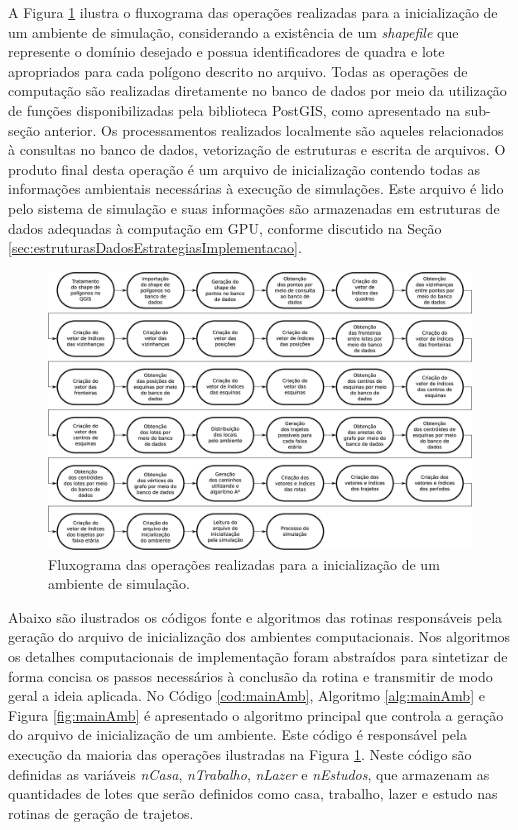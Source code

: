 A Figura \ref{fig:inicializacaoAmbiente} ilustra o fluxograma das operações realizadas para a inicialização de um ambiente de simulação, considerando a existência de um \textit{shapefile} que represente o domínio desejado e possua identificadores de quadra e lote apropriados para cada polígono descrito no arquivo. Todas as operações de computação são realizadas diretamente no banco de dados por meio da utilização de funções disponibilizadas pela biblioteca PostGIS, como apresentado na sub-seção anterior. Os processamentos realizados localmente são aqueles relacionados à consultas no banco de dados, vetorização de estruturas e escrita de arquivos. O produto final desta operação é um arquivo de inicialização contendo todas as informações ambientais necessárias à execução de simulações. Este arquivo é lido pelo sistema de simulação e suas informações são armazenadas em estruturas de dados adequadas à computação em GPU, conforme discutido na Seção \ref{sec:estruturasDadosEstrategiasImplementacao}.

\begin{figure}[H]
  \centering
  \includegraphics[width=1\textwidth]{Figuras/Simula/inicializacaoAmbiente.eps}
  \caption{Fluxograma das operações realizadas para a inicialização de um ambiente de simulação.}
  \label{fig:inicializacaoAmbiente}
\end{figure} 

\newpage

Abaixo são ilustrados os códigos fonte e algoritmos das rotinas responsáveis pela geração do arquivo de inicialização dos ambientes computacionais. Nos algoritmos os detalhes computacionais de implementação foram abstraídos para sintetizar de forma concisa os passos necessários à conclusão da rotina e transmitir de modo geral a ideia aplicada. No Código \ref{cod:mainAmb}, Algoritmo \ref{alg:mainAmb} e Figura \ref{fig:mainAmb} é apresentado o algoritmo principal que controla a geração do arquivo de inicialização de um ambiente. Este código é responsável pela execução da maioria das operações ilustradas na Figura \ref{fig:inicializacaoAmbiente}. Neste código são definidas as variáveis \textit{nCasa}, \textit{nTrabalho}, \textit{nLazer} e \textit{nEstudos}, que armazenam as quantidades de lotes que serão definidos como casa, trabalho, lazer e estudo nas rotinas de geração de trajetos. 

